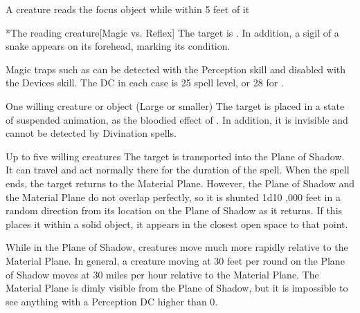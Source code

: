 \spellline
\begin{spelltrigger}{A creature reads the focus object while within 5 feet of it}
    \begin{spelltarget}*{The reading creature}[Magic vs. Reflex]
        \spellsuccess The target is \slowed. In addition, a sigil of a snake appears on its forehead, marking its condition.
    \end{spelltarget}
\end{spelltrigger}
\spellnotes Magic traps such as  can be detected with the Perception skill and disabled with the Devices skill. The DC in each case is 25 \add spell level, or 28 for .

\begin{spelltarget}{One willing creature or object (Large or smaller)}
    \spelleffect The target is placed in a state of suspended animation, as the bloodied effect of . In addition, it is invisible and cannot be detected by Divination spells.
\end{spelltarget}

\spelldur{\durext \dismissable}
\begin{spelltargets}{Up to five willing creatures}
    \spelleffect The target is transported into the Plane of Shadow. It can travel and act normally there for the duration of the spell. When the spell ends, the target returns to the Material Plane. However, the Plane of Shadow and the Material Plane do not overlap perfectly, so it is shunted 1d10 ,000 feet in a random direction from its location on the Plane of Shadow as it returns. If this places it within a solid object, it appears in the closest open space to that point.
\end{spelltargets}
\spellnotes While in the Plane of Shadow, creatures move much more rapidly relative to the Material Plane. In general, a creature moving at 30 feet per round on the Plane of Shadow moves at 30 miles per hour relative to the Material Plane. The Material Plane is dimly visible from the Plane of Shadow, but it is impossible to see anything with a Perception DC higher than 0.

